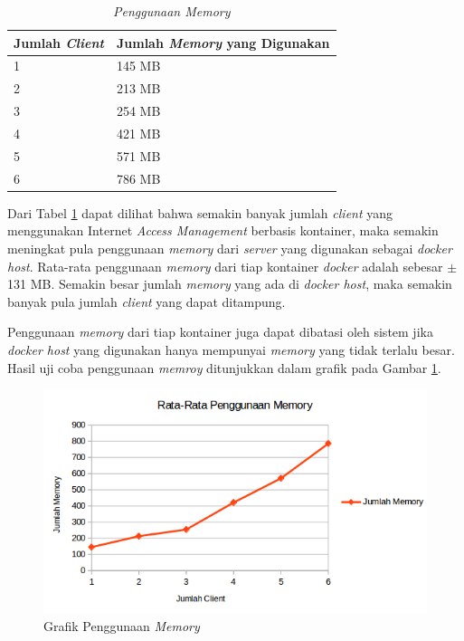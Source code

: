 \begin{longtable}{|p{}|p{}|}
	\caption{\textit{Penggunaan \textit{Memory}}} \label{penggunaanmemory1} \\
	\hline
	\textbf{Jumlah \textit{Client}} & \textbf{Jumlah \textit{Memory} yang Digunakan} \\ \hline
	\endfirsthead

	\endhead
	\endfoot
	\endlastfoot
	
	1 & 145 MB \\ \hline
	2 & 213 MB \\ \hline
	3 & 254 MB \\ \hline
	4 & 421 MB \\ \hline
	5 & 571 MB \\ \hline
	6 & 786 MB \\ \hline
\end{longtable}
Dari Tabel \ref{penggunaanmemory1} dapat dilihat bahwa semakin banyak jumlah \textit{client} yang menggunakan Internet \textit{Access Management} berbasis kontainer, maka semakin meningkat pula penggunaan \textit{memory} dari \textit{server} yang digunakan sebagai \textit{docker host}. Rata-rata penggunaan \textit{memory} dari tiap kontainer \textit{docker} adalah sebesar $\pm$ 131 MB. Semakin besar jumlah \textit{memory} yang ada di \textit{docker host}, maka semakin banyak pula jumlah \textit{client} yang dapat ditampung.

Penggunaan \textit{memory} dari tiap kontainer juga dapat dibatasi oleh sistem jika \textit{docker host} yang digunakan hanya mempunyai \textit{memory} yang tidak terlalu besar. Hasil uji coba penggunaan \textit{memroy} ditunjukkan dalam grafik pada Gambar \ref{ram1}.

\begin{figure}[H]
	\centering
	\includegraphics[width=\linewidth]{images/bab5/ram1}
	\caption{Grafik Penggunaan \textit{Memory}}
	\label{ram1}
\end{figure}

